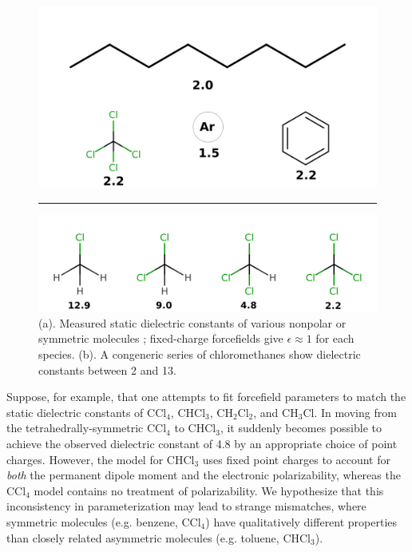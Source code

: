 \documentclass[aps,pre,twocolumn,nofootinbib,superscriptaddress,linenumbers]{revtex4-1}
\begin{document}
\begin{figure}

\includegraphics[width=\columnwidth]{./figures/molecules.png}

\noindent\rule{8cm}{0.4pt}

\includegraphics[width=\columnwidth]{./figures/chlorides.png}

\caption{(a). Measured static dielectric constants of various nonpolar or symmetric molecules \cite{wikipedia}; fixed-charge forcefields give $\epsilon \approx 1$ for each species.  
(b).  A congeneric series of chloromethanes show dielectric constants between 2 and 13.  
}
\label{figure:nonpolars}

\end{figure}


Suppose, for example, that one attempts to fit forcefield parameters to match the static dielectric constants of $\mathrm{CCl_4}$, $\mathrm{CHCl_3}$, $\mathrm{CH_2Cl_2}$, and $\mathrm{CH_3Cl}$.
In moving from the tetrahedrally-symmetric $\mathrm{CCl_4}$ to $\mathrm{CHCl_3}$, it suddenly becomes possible to achieve the observed dielectric constant of 4.8 by an appropriate choice of point charges.
However, the model for $\mathrm{CHCl_3}$ uses fixed point charges to account for \emph{both} the permanent dipole moment and the electronic polarizability, whereas the $\mathrm{CCl_4}$ model contains no treatment of polarizability.  
We hypothesize that this inconsistency in parameterization may lead to strange mismatches, where symmetric molecules (e.g. benzene, $\mathrm{CCl_4}$) have qualitatively different properties than closely related asymmetric molecules (e.g. toluene, $\mathrm{CHCl_3}$).
\end{document}
